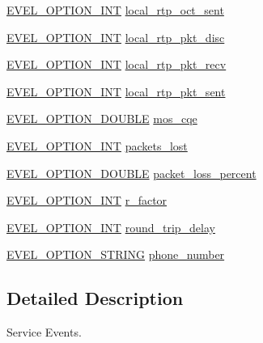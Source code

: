\begin{DoxyCompactItemize}
\item 
\hyperlink{evel_8h_a452d825778d1c2368a54b8f689a25ba7}{E\+V\+E\+L\+\_\+\+O\+P\+T\+I\+O\+N\+\_\+\+I\+NT} \hyperlink{structevent__service_a863833887eb2e138483e8e7f453c999a}{local\+\_\+rtp\+\_\+oct\+\_\+sent}
\item 
\hyperlink{evel_8h_a452d825778d1c2368a54b8f689a25ba7}{E\+V\+E\+L\+\_\+\+O\+P\+T\+I\+O\+N\+\_\+\+I\+NT} \hyperlink{structevent__service_a669060c8c84973215d793b7e6ac9d979}{local\+\_\+rtp\+\_\+pkt\+\_\+disc}
\item 
\hyperlink{evel_8h_a452d825778d1c2368a54b8f689a25ba7}{E\+V\+E\+L\+\_\+\+O\+P\+T\+I\+O\+N\+\_\+\+I\+NT} \hyperlink{structevent__service_a1ed43f9bcff2e79d4921dd3d332f0a9f}{local\+\_\+rtp\+\_\+pkt\+\_\+recv}
\item 
\hyperlink{evel_8h_a452d825778d1c2368a54b8f689a25ba7}{E\+V\+E\+L\+\_\+\+O\+P\+T\+I\+O\+N\+\_\+\+I\+NT} \hyperlink{structevent__service_abe8309829a9899418fc437bbf7a7fa64}{local\+\_\+rtp\+\_\+pkt\+\_\+sent}
\item 
\hyperlink{evel_8h_aafc42b3cd9aca88804c3d413e4ccec06}{E\+V\+E\+L\+\_\+\+O\+P\+T\+I\+O\+N\+\_\+\+D\+O\+U\+B\+LE} \hyperlink{structevent__service_a8bf0cb24c4e5b5a8ff44e1954780776c}{mos\+\_\+cqe}
\item 
\hyperlink{evel_8h_a452d825778d1c2368a54b8f689a25ba7}{E\+V\+E\+L\+\_\+\+O\+P\+T\+I\+O\+N\+\_\+\+I\+NT} \hyperlink{structevent__service_abb1de42ce90679db77322fdb2fbc83e2}{packets\+\_\+lost}
\item 
\hyperlink{evel_8h_aafc42b3cd9aca88804c3d413e4ccec06}{E\+V\+E\+L\+\_\+\+O\+P\+T\+I\+O\+N\+\_\+\+D\+O\+U\+B\+LE} \hyperlink{structevent__service_abc563b92046f42cf2cffbb3c6aac195f}{packet\+\_\+loss\+\_\+percent}
\item 
\hyperlink{evel_8h_a452d825778d1c2368a54b8f689a25ba7}{E\+V\+E\+L\+\_\+\+O\+P\+T\+I\+O\+N\+\_\+\+I\+NT} \hyperlink{structevent__service_aadb3e6a2636c2729ccebd845ea930f8b}{r\+\_\+factor}
\item 
\hyperlink{evel_8h_a452d825778d1c2368a54b8f689a25ba7}{E\+V\+E\+L\+\_\+\+O\+P\+T\+I\+O\+N\+\_\+\+I\+NT} \hyperlink{structevent__service_ac1ce381c2c76626a0bb7379dc8c188d8}{round\+\_\+trip\+\_\+delay}
\item 
\hyperlink{evel_8h_a0de5113a7b72de93c0c7b644f7ea7ec3}{E\+V\+E\+L\+\_\+\+O\+P\+T\+I\+O\+N\+\_\+\+S\+T\+R\+I\+NG} \hyperlink{structevent__service_aaae9e1bf66750946d7990c2346f41fe8}{phone\+\_\+number}
\end{DoxyCompactItemize}


\subsection{Detailed Description}
Service Events. 

